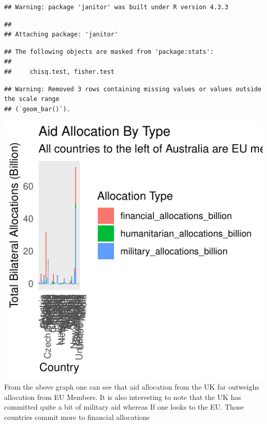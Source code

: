 \documentclass[11pt,preprint, authoryear]{elsarticle}
\numberwithin{equation}{section}
\numberwithin{figure}{section}
\numberwithin{table}{section}
\begin{document}
\begin{verbatim}
## Warning: package 'janitor' was built under R version 4.3.3
\end{verbatim}

\begin{verbatim}
## 
## Attaching package: 'janitor'
\end{verbatim}

\begin{verbatim}
## The following objects are masked from 'package:stats':
## 
##     chisq.test, fisher.test
\end{verbatim}

\begin{Shaded}
\begin{Highlighting}[]
\end{Highlighting}
\end{Shaded}

\begin{verbatim}
## Warning: Removed 3 rows containing missing values or values outside the scale range
## (`geom_bar()`).
\end{verbatim}

\includegraphics{Question_3_files/figure-latex/unnamed-chunk-3-1.pdf}
From the above graph one can see that aid allocation from the UK far
outweighs allocation from EU Members. It is also interesting to note
that the UK has committed quite a bit of military aid whereas If one
looks to the EU. Those countries commit more to financial allocations
\end{document}
